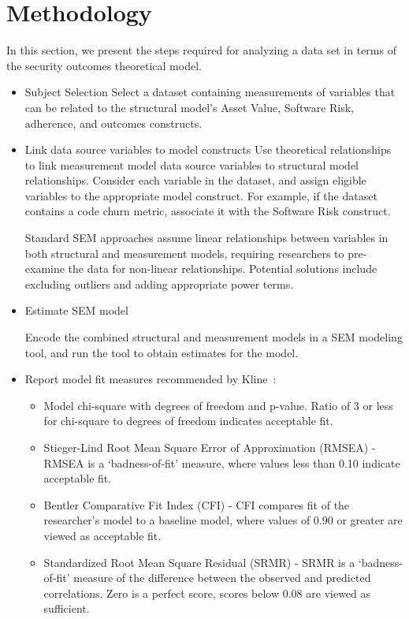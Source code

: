 \section{Methodology}
\label{sec:methodology}

In this section, we present the steps required for analyzing a data set in terms of the security outcomes theoretical model.
\begin{itemize}
\item Subject Selection
Select a dataset containing measurements of variables that can be related to the structural model's Asset Value, Software Risk, adherence, and outcomes constructs.  

\item Link data source variables to model constructs 
Use theoretical relationships to link measurement model data source variables to structural model relationships. Consider each variable in the dataset, and assign eligible variables to the appropriate model construct. For example, if the dataset contains a code churn metric, associate it with the Software Risk construct. 

Standard SEM approaches assume linear relationships between variables in both structural and measurement models, requiring researchers to pre-examine the data for non-linear relationships. Potential solutions include excluding outliers and adding appropriate power terms.
 
\item Estimate SEM model 

Encode the combined structural and measurement models in a SEM modeling tool, and run the tool to obtain estimates for the model.
\item Report model fit measures recommended by Kline~\cite{kline2015principles}:
\begin{itemize}
	\item Model chi-square with degrees of freedom and p-value. Ratio of 3 or less for chi-square to degrees of freedom indicates acceptable fit.
	\item Stieger-Lind Root Mean Square Error of Approximation (RMSEA) - RMSEA is a `badness-of-fit' measure, where values less than 0.10 indicate acceptable fit.
	\item Bentler Comparative Fit Index (CFI) - CFI compares fit of the researcher's model to a baseline model, where values of 0.90 or greater are viewed as acceptable fit.
	\item Standardized Root Mean Square Residual (SRMR) - SRMR is a `badness-of-fit' measure of the difference between the observed and predicted correlations. Zero is a perfect score, scores below 0.08 are viewed as sufficient.
\end{itemize}


\end{itemize}

